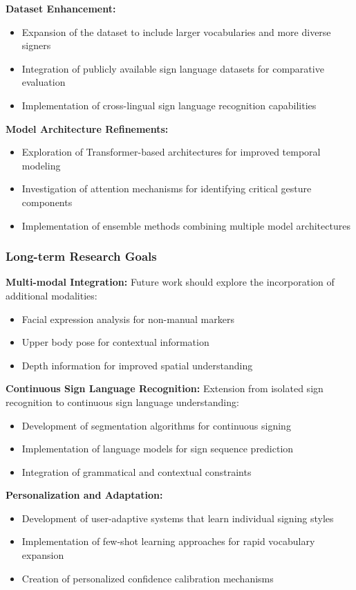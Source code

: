 \documentclass[11pt, a4paper]{article}
\begin{document}
\textbf{Dataset Enhancement:}
\begin{itemize}
    \item Expansion of the dataset to include larger vocabularies and more diverse signers
    \item Integration of publicly available sign language datasets for comparative evaluation
    \item Implementation of cross-lingual sign language recognition capabilities
\end{itemize}

\textbf{Model Architecture Refinements:}
\begin{itemize}
    \item Exploration of Transformer-based architectures for improved temporal modeling
    \item Investigation of attention mechanisms for identifying critical gesture components
    \item Implementation of ensemble methods combining multiple model architectures
\end{itemize}

\subsubsection{Long-term Research Goals}

\textbf{Multi-modal Integration:}
Future work should explore the incorporation of additional modalities:
\begin{itemize}
    \item Facial expression analysis for non-manual markers
    \item Upper body pose for contextual information
    \item Depth information for improved spatial understanding
\end{itemize}

\textbf{Continuous Sign Language Recognition:}
Extension from isolated sign recognition to continuous sign language understanding:
\begin{itemize}
    \item Development of segmentation algorithms for continuous signing
    \item Implementation of language models for sign sequence prediction
    \item Integration of grammatical and contextual constraints
\end{itemize}

\textbf{Personalization and Adaptation:}
\begin{itemize}
    \item Development of user-adaptive systems that learn individual signing styles
    \item Implementation of few-shot learning approaches for rapid vocabulary expansion
    \item Creation of personalized confidence calibration mechanisms
\end{itemize}
\end{document}
